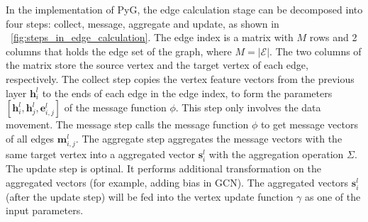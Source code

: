 In the implementation of PyG, the edge calculation stage can be decomposed into four steps: collect, message, aggregate and update, as shown in \figurename~\ref{fig:steps_in_edge_calculation}.
The edge index is a matrix with $M$ rows and 2 columns that holds the edge set of the graph, where $M=|\mathcal{E}|$.
The two columns of the matrix store the source vertex and the target vertex of each edge, respectively.
The collect step copies the vertex feature vectors from the previous layer $\boldsymbol{h}_i^l$ to the ends of each edge
in the edge index, to form the parameters $[\boldsymbol{h}^l_i, \boldsymbol{h}^l_{j}, \boldsymbol{e}^l_{i,j}]$ of the message function $\phi$.
This step only involves the data movement.
The message step calls the message function $\phi$ to get message vectors of all edges $\boldsymbol{m}_{i, j}^l$.
The aggregate step aggregates the message vectors with the same target vertex into a aggregated vector $\boldsymbol{s}^l_i$ with the aggregation operation $\Sigma$.
The update step is optinal.
It performs additional transformation on the aggregated vectors (for example, adding bias in GCN).
The aggregated vectors $\boldsymbol{s}^l_i$ (after the update step) will be fed into the vertex update function $\gamma$ as one of the input parameters.

